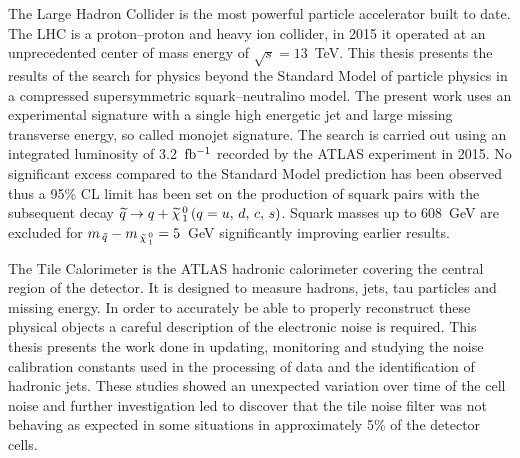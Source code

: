 The Large Hadron Collider is the most powerful particle accelerator built to
date. The LHC is a proton--proton and heavy ion collider, in 2015 it operated at
an unprecedented center of mass energy of $\sqrt{s} = 13$~TeV. This thesis
presents the results of the search for physics beyond the Standard Model of
particle physics in a compressed supersymmetric squark--neutralino model. The
present work uses an experimental signature with a single high energetic jet and
large missing transverse energy, so called monojet signature. The search is
carried out using an integrated luminosity of 3.2~$\mbox{fb$^{-1}$}$ recorded by the ATLAS
experiment in 2015. No significant excess compared to the Standard Model
prediction has been observed thus a 95\% CL limit has been set on the production
of squark pairs with the subsequent decay $\widetilde{q} \rightarrow q + \widetilde{\chi}_{\, 1}^{\, 0}\, (q = u,\, d,\, c,\, s)$. Squark masses up to
608~GeV are excluded for $m_{\, \tilde{q}} - m_{\, \tilde{\chi}_{\, 1}^{\, 0}} = 5$~GeV significantly
improving earlier results.

The Tile Calorimeter is the ATLAS hadronic calorimeter covering the central
region of the detector. It is designed to measure hadrons, jets, tau particles
and missing energy. In order to accurately be able to properly reconstruct these
physical objects a careful description of the electronic noise is required. This
thesis presents the work done in updating, monitoring and studying the noise
calibration constants used in the processing of data and the identification of
hadronic jets. These studies showed an unexpected variation over time of the
cell noise and further investigation led to discover that the tile noise filter
was not behaving as expected in some situations in approximately 5\% of the
detector cells.
